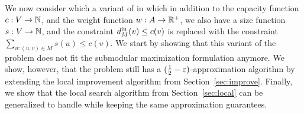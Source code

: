 
We now consider \gcp which a variant of \carpool in which in addition
to the capacity function $c:V \to \N$, and the weight function
$w:A \to \R^+$, we also have a size function $s:V \to \N$, and the
constraint $\din[M](v) \leq c(v)$ is replaced with the constraint
$\sum_{u:(u,v) \in M} s(u) \leq c(v)$.
%
%
We start by showing that this variant of the problem does not fit the
submodular maximization formulation anymore.  We show, however, that
the problem still has a $(\half -\eps)$-approximation algorithm by
extending the local improvement algorithm from
Section~\ref{sec:improve}.
%
Finally, we show that the local search algorithm from
Section~\ref{sec:local} can be generalized to handle \gcp while
keeping the same approximation guarantees.
